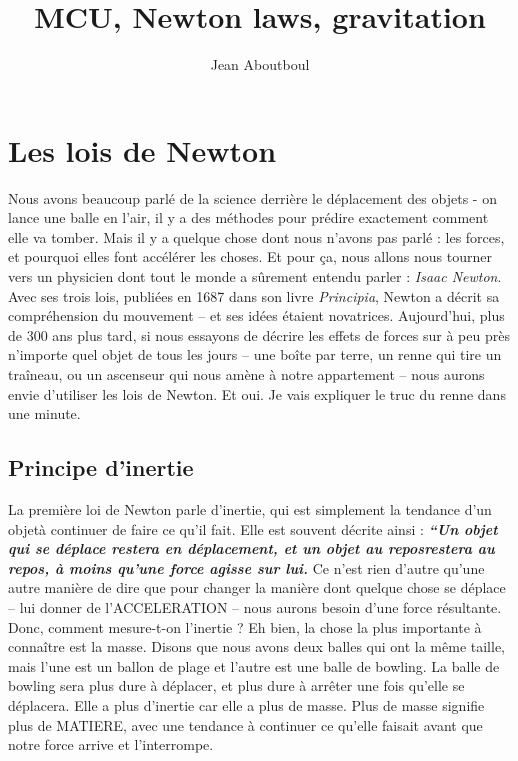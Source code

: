 \documentclass[a4paper, twoside]{article}
\title{MCU, Newton laws, gravitation}
\author{Jean Aboutboul}
\begin{document}
\maketitle
\renewcommand{\headrulewidth}{0pt}
\strut

\hypertarget{les-lois-de-newton}{%
\section{Les lois de Newton}\label{les-lois-de-newton}}

Nous avons beaucoup parlé de la science derrière le déplacement des
objets - on lance une balle en l'air, il y a des méthodes pour prédire
exactement comment elle va tomber. Mais il y a quelque chose dont nous
n'avons pas parlé : les forces, et pourquoi elles font accélérer les
choses. Et pour ça, nous allons nous tourner vers un physicien dont tout
le monde a sûrement entendu parler : \emph{Isaac Newton}. Avec ses trois
lois, publiées en 1687 dans son livre \emph{Principia}, Newton a décrit
sa compréhension du mouvement -- et ses idées étaient novatrices.
Aujourd'hui, plus de 300 ans plus tard, si nous essayons de décrire les
effets de forces sur à peu près n'importe quel objet de tous les jours
-- une boîte par terre, un renne qui tire un traîneau, ou un ascenseur
qui nous amène à notre appartement -- nous aurons envie d'utiliser les
lois de Newton. Et oui. Je vais expliquer le truc du renne dans une
minute.

\hypertarget{principe-dinertie}{%
\subsection{Principe d'inertie}\label{principe-dinertie}}

La première loi de Newton parle d'inertie, qui est simplement la
tendance d'un objetà continuer de faire ce qu'il fait. Elle est souvent
décrite ainsi : \textbf{\emph{``Un objet qui se déplace restera en
déplacement, et un objet au reposrestera au repos, à moins qu'une force
agisse sur lui.}} Ce n'est rien d'autre qu'une autre manière de dire que
pour changer la manière dont quelque chose se déplace -- lui donner de
l'ACCELERATION -- nous aurons besoin d'une force résultante. Donc,
comment mesure-t-on l'inertie ? Eh bien, la chose la plus importante à
connaître est la masse. Disons que nous avons deux balles qui ont la
même taille, mais l'une est un ballon de plage et l'autre est une balle
de bowling. La balle de bowling sera plus dure à déplacer, et plus dure
à arrêter une fois qu'elle se déplacera. Elle a plus d'inertie car elle
a plus de masse. Plus de masse signifie plus de MATIERE, avec une
tendance à continuer ce qu'elle faisait avant que notre force arrive et
l'interrompe.
\end{document}
